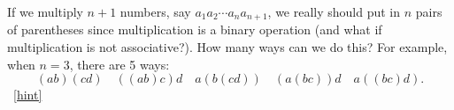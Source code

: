 \documentclass{book}
\begin{document}
\setcounter{project}{175}
\addtocounter{project}{-1}
\begin{activity}[]\label{act-parenthesize}
\hypertarget{p-1050}{}%
If we multiply \(n+1\) numbers, say \(a_1a_2\cdots a_n a_{n+1}\), we really should put in \(n\) pairs of parentheses since multiplication is a binary operation (and what if multiplication is not associative?).  How many ways can we do this?  For example, when \(n = 3\), there are 5 ways:%
\begin{equation*}
(ab)(cd)\quad ((ab)c)d \quad a(b(cd)) \quad (a(bc))d \quad a((bc)d).
\end{equation*}
%
~\hfill{\tiny\hyperlink{a-175}{[hint]}\hypertarget{q-175}{}}\end{activity}
\end{document}
